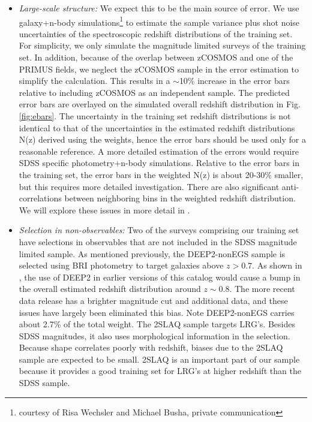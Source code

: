\documentclass[preprint]{aastex}
\begin{document}
\begin{itemize}

\item {\it Large-scale structure:} We expect this to be the main source of
error.  We use galaxy+n-body simulations\footnote{courtesy of Risa Wechsler and
Michael Busha, private communication} to estimate the sample variance plus shot
noise uncertainties of the spectroscopic redshift distributions of the training
set.  For simplicity, we only simulate the magnitude limited surveys of the
training set.  In addition, because of the overlap between zCOSMOS and one of
the PRIMUS fields, we neglect the zCOSMOS sample in the error estimation to
simplify the calculation.  This results in a $\sim$10\% increase in the error
bars relative to including zCOSMOS as an independent sample.  The predicted
error bars are overlayed on the simulated overall redshift distribution in Fig.
\ref{fig:ebars}.  The uncertainty in the training set redshift distributions is
not identical to that of the uncertainties in the estimated redshift
distributions N(z) derived using the weights, hence the error bars should be
used only for a reasonable reference.  A more detailed estimation of the errors
would require SDSS specific photometry+n-body simulations.  Relative to the
error bars in the training set, the error bars in the weighted N(z) is about
20-30\% smaller, but this requires more detailed investigation.  There are also
significant anti-correlations between neighboring bins in the weighted redshift
distribution.  We will explore these issues in more detail in
\citet{CunhaPhotozLSS11}.

\item {\it Selection in non-observables:} Two of the surveys comprising our
training set have selections in observables that are not included in the SDSS
magnitude limited sample.  As mentioned previously, the DEEP2-nonEGS sample is
selected using BRI photometry to target galaxies above $z>0.7$.  As shown in
\citet{CunhaPhotoz09}, the use of DEEP2 in earlier versions of this catalog
would cause a bump in the overall estimated redshift distribution around $z\sim
0.8$.  The more recent data release has a brighter magnitude cut and additional
data, and these issues have largely been eliminated this bias.  Note
DEEP2-nonEGS carries about 2.7\% of the total weight.  The 2SLAQ sample targets
LRG's.  Besides SDSS magnitudes, it also uses morphological information in the
selection.  Because shape correlates poorly with redshift, biases due to the
2SLAQ sample are expected to be small.  2SLAQ is an important part of our
sample because it provides a good training set for LRG's at higher redshift
than the SDSS sample.


\end{itemize}
\end{document}
